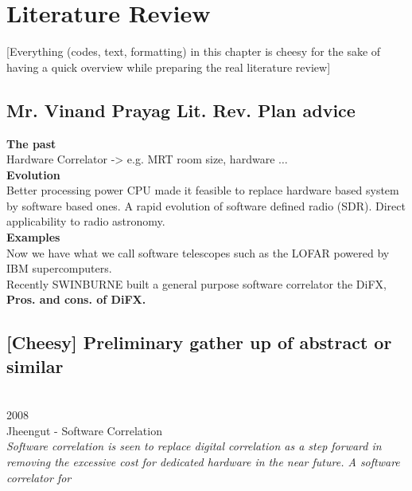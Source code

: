 \chapter{Literature Review}
\label{litReview}

[Everything (codes, text, formatting) in this chapter is cheesy for the sake of having a quick overview while preparing the real literature review]
\section{Mr. Vinand Prayag Lit. Rev. Plan advice}
\textbf{The past}\\
Hardware Correlator -> e.g. MRT room size, hardware $\ldots$\\
\textbf{Evolution}\\
Better processing power CPU made it feasible to replace hardware based system by software based ones. 
A rapid evolution of software defined radio (SDR). Direct applicability to radio astronomy.\\
\textbf{Examples}\\
Now we have what we call software telescopes such as the LOFAR powered by IBM supercomputers.\\
Recently SWINBURNE built a general purpose software correlator the DiFX,\\
\textbf{Pros. and cons. of DiFX.}


\section{[Cheesy] Preliminary gather up of abstract or similar}
\hfill\\
{\large 2008}\\ \nocite{jheengut2008MRTsoftcrr}
{\large Jheengut - Software Correlation}\\
\indent
\textit{Software correlation is seen to replace digital correlation as a step forward in removing the excessive cost for dedicated hardware in the near future. A software correlator for}

